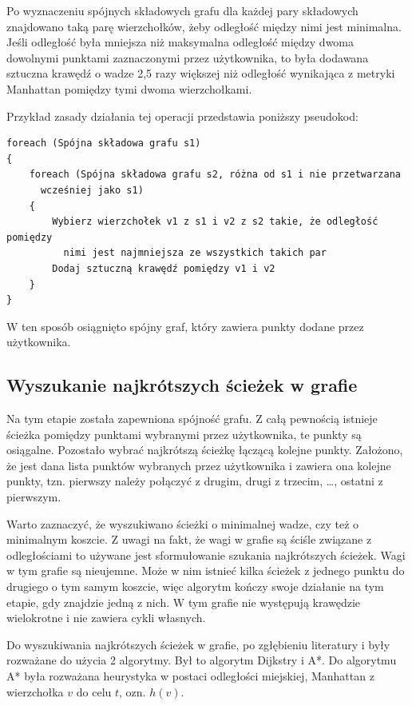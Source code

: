 \documentclass[a4paper,11pt,twoside,openright]{report}
\theoremstyle{definition}
\begin{document}
Po wyznaczeniu spójnych składowych grafu dla każdej pary składowych znajdowano
taką parę wierzchołków, żeby odległość między nimi jest minimalna. Jeśli odległość
była mniejsza niż maksymalna odległość między dwoma dowolnymi punktami zaznaczonymi
przez użytkownika, to była dodawana sztuczna krawędź o wadze 2,5 razy większej
niż odległość wynikająca z metryki Manhattan pomiędzy tymi dwoma wierzchołkami.

Przykład zasady działania tej operacji przedstawia poniższy pseudokod:

\begin{verbatim}
foreach (Spójna składowa grafu s1)
{
    foreach (Spójna składowa grafu s2, różna od s1 i nie przetwarzana
      wcześniej jako s1)
    {
        Wybierz wierzchołek v1 z s1 i v2 z s2 takie, że odległość pomiędzy
          nimi jest najmniejsza ze wszystkich takich par
        Dodaj sztuczną krawędź pomiędzy v1 i v2
    }
}
\end{verbatim}


W ten sposób osiągnięto spójny graf, który zawiera punkty dodane przez użytkownika.

\subsection {Wyszukanie najkrótszych ścieżek w grafie}

Na tym etapie została zapewniona spójność grafu. Z całą pewnością istnieje ścieżka
pomiędzy punktami wybranymi przez użytkownika, te punkty są osiągalne. Pozostało
wybrać najkrótszą ścieżkę łączącą kolejne punkty. Założono, że jest dana lista
punktów wybranych przez użytkownika i zawiera ona kolejne punkty, tzn. pierwszy
należy połączyć z drugim, drugi z trzecim, \dots, ostatni z pierwszym.

Warto zaznaczyć, że wyszukiwano ścieżki o minimalnej wadze, czy też o minimalnym
koszcie. Z uwagi na fakt, że wagi w grafie są ściśle związane z odległościami to
używane jest sformułowanie szukania najkrótszych ścieżek. Wagi w tym grafie są
nieujemne. Może w nim istnieć kilka ścieżek z jednego punktu do drugiego o tym
samym koszcie, więc algorytm kończy swoje działanie na tym etapie, gdy znajdzie
jedną z nich. W tym grafie nie występują krawędzie wielokrotne i nie zawiera
cykli własnych.

Do wyszukiwania najkrótszych ścieżek w grafie, po zgłębieniu literatury
\cite{Algorytmy Sedgewick} i \cite{AiSD2} były rozważane do użycia 2 algorytmy.
Był to algorytm Dijkstry i A*. Do algorytmu A* była rozważana heurystyka w postaci
odległości miejskiej, Manhattan z wierzchołka $v$ do celu $t$, ozn. $h(v)$.
\end{document}
